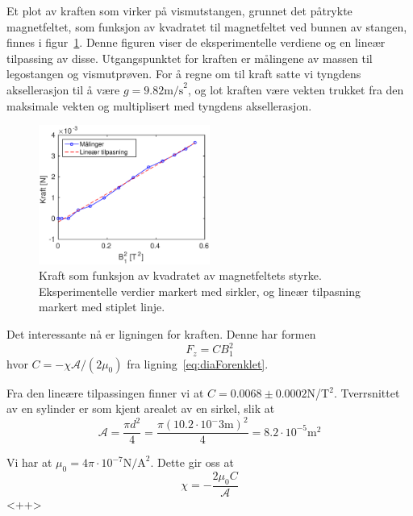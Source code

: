 \documentclass[a4paper,11pt, twocolumn]{article}
\begin{document}
Et plot av kraften som virker på vismutstangen, grunnet det påtrykte magnetfeltet, som funksjon av kvadratet til magnetfeltet ved bunnen av stangen, finnes i figur~\ref{fig:lintilpass}. Denne figuren viser de eksperimentelle verdiene og en lineær tilpassing av disse. Utgangspunktet for kraften er målingene av massen til legostangen og vismutprøven. For å regne om til kraft satte vi tyngdens aksellerasjon til å være $g=9.82\text{m/s}^2$, og lot kraften være vekten trukket fra den maksimale vekten og multiplisert med tyngdens aksellerasjon.

\begin{figure}[!ht]
	\centering
	\includegraphics[width = 0.5\textwidth]{matlab/tilpasning.eps}
	\caption{Kraft som funksjon av kvadratet av magnetfeltets styrke. Eksperimentelle verdier markert med sirkler, og lineær tilpasning markert med stiplet linje.}
	\label{fig:lintilpass}
\end{figure}
Det interessante nå er ligningen for kraften. Denne har formen
\begin{equation}
	F_z = CB_1^2
	\label{eq:linear}
\end{equation}
hvor $C=-\chi\mathcal{A}/(2\mu_0)$ fra ligning~\eqref{eq:diaForenklet}.

Fra den lineære tilpassingen finner vi at $C = 0.0068\pm0.0002$N/T$^2$. Tverrsnittet av en sylinder er som kjent arealet av en sirkel, slik at
\begin{equation}
	\mathcal{A} = \frac{\pi d^2}{4}=\frac{\pi (10.2\cdot10^-3\text{m})^2}{4}=8.2\cdot10^{-5}\text{m}^2
	\label{eq:area}
\end{equation}

Vi har at $\mu_0=4\pi\cdot10^{-7}\text{N/A}^2$. Dette gir oss at 
\begin{equation}
	\chi = -\frac{2\mu_0 C}{\mathcal{A}}
	\label{<++>}
\end{equation}<++>
\end{document}
